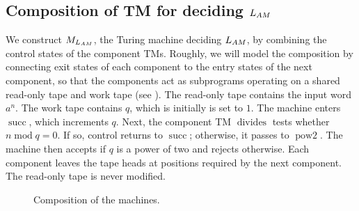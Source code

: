 \documentclass[UTF8]{article}
\renewcommand{\L}{{L_{\tiny{AM}}}}
\begin{document}
\subsection{Composition of TM for deciding $\L$}


We construct $M_{\L}$, the Turing machine deciding $\L$,
by combining the control states of the component TMs.
Roughly, we will model the composition by connecting exit states of each component to the entry states of the next component,
so that the components act as subprograms operating on
a shared read-only tape and work tape (see ).
The read-only tape contains the input word $a^n$.
The work tape contains $q$, which is initially is set to $1$.
The machine enters $\operatorname{succ}$, which increments $q$.
Next, the component TM $\operatorname{divides}$ tests whether $n \operatorname{mod}q=0$. If so, control returns to $\operatorname{succ}$; otherwise, it passes to $\operatorname{pow2}$.
The machine then accepts if $q$ is a power
of two and rejects otherwise. 
Each component leaves
the tape heads at positions required by the next component.
The read-only tape is never modified.

\begin{figure}[ht]
  \centering
  \resizebox{0.7\textwidth}{!}{}
  \caption{Composition of the machines.}
  \label{fig:machines}
\end{figure}


\end{document}
